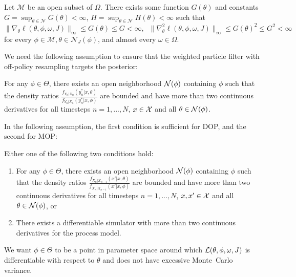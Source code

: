 \documentclass{article}
\begin{document}
\begin{aspt}
\label{assump:local-bounded-derivative}
Let $\mathcal{M}$ be an open subset of $\Omega$. There exists some function $G(\theta)$ and constants $G=\sup _{\theta \in \mathcal{N}} G(\theta)<\infty$, $H=\sup _{\theta \in \mathcal{N}} H(\theta)<\infty$ such that
    $$
    \|\nabla_\theta \ell(\theta, \phi, \omega, J)\|_\infty \leq G(\theta) \leq G<\infty, \;\;
    \|\nabla^2_\theta \ell(\theta, \phi, \omega, J)\|_\infty \leq G(\theta)^2 \leq G^2<\infty
    $$
    for every $\phi \in \mathcal{M}, \theta \in \mathcal{N}_J(\phi)$, and almost every $\omega \in \Omega$.
\end{aspt}


We need the following assumption to ensure that the weighted particle filter with off-policy resampling targets the posterior:
\begin{aspt}
    \label{assump:diff-meas}
    For any $\phi \in \Theta$, there exists an open neighborhood ${\mathcal{N}}(\phi)$ containing $\phi$ such that the density ratios $\frac{f_{Y_n|X_n}(y_n^*|x, \theta)}{f_{Y_n|X_n}(y_n^*|x, \phi)}$ are bounded and have more than two continuous derivatives for all timesteps $n=1,...,N$, $x \in {\mathcal{X}}$ and all $\theta\in{\mathcal{N}}(\phi)$. 
\end{aspt}

In the following assumption, the first condition is sufficient for DOP, and the second for MOP:
\begin{aspt}
    \label{assump:diff-process}
    Either one of the following two conditions hold:
    \begin{enumerate}
        \item For any $\phi \in \Theta$, there exists an open neighborhood ${\mathcal{N}}(\phi)$ containing $\phi$ such that the density ratios $\frac{f_{X_n|X_{n-1}}(x'|x, \theta)}{f_{X_n|X_{n-1}}(x'|x, \phi)}$ are bounded and have more than two continuous derivatives for all timesteps $n=1,...,N$, $x, x' \in {\mathcal{X}}$ and all $\theta\in{\mathcal{N}}(\phi)$, or
        \item There exists a differentiable simulator with more than two continuous derivatives for the process model. 
    \end{enumerate}
\end{aspt}

We want $\phi\in\Theta$ to be a point in parameter space around which $\mathcal{L}(\theta,\phi,\omega, J)$ is differentiable with respect to $\theta$ and does not have excessive Monte~Carlo variance.
\end{document}
